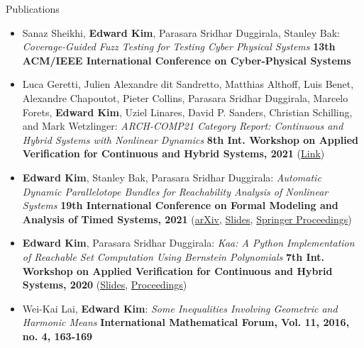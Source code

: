 \documentclass{resume} %
\begin{document}
\begin{rSection}{Publications}
  \begin{itemize}[leftmargin=*]
    \item Sanaz Sheikhi, {\bf Edward Kim}, Parasara Sridhar Duggirala, Stanley Bak: \newline
    \textit{Coverage-Guided Fuzz Testing for Testing Cyber Physical Systems} \newline
    {\bf 13th ACM/IEEE International Conference on Cyber-Physical Systems}

    \item  Luca Geretti, Julien Alexandre dit Sandretto, Matthias Althoff, Luis Benet, Alexandre Chapoutot, Pieter Collins, Parasara Sridhar Duggirala, Marcelo Forets, {\bf Edward Kim}, Uziel Linares, David P. Sanders, Christian Schilling, and Mark Wetzlinger: \newline
    \textit{ARCH-COMP21 Category Report: Continuous and Hybrid Systems with Nonlinear Dynamics} \newline
    {\bf 8th Int. Workshop on Applied Verification for Continuous and Hybrid Systems, 2021}
    \newline
    (\href{https://easychair.org/publications/paper/GWwz}{Link})

    \item {\bf Edward Kim}, Stanley Bak, Parasara Sridhar Duggirala: \newline
    \textit{Automatic Dynamic Parallelotope Bundles for Reachability Analysis of Nonlinear Systems} \newline
    {\bf 19th International Conference on Formal Modeling and Analysis of Timed Systems, 2021} \newline
    (\href{https://arxiv.org/abs/2105.11796}{arXiv}, \href{https://ekim1919.github.io/files/formats21.pdf)}{Slides}, \href{https://link.springer.com/book/10.1007/978-3-030-85037-1}{Springer Proceedings})

    \item {\bf Edward Kim}, Parasara Sridhar Duggirala: \newline
    \textit{Kaa: A Python Implementation of Reachable Set Computation Using Bernstein Polynomials} \newline
    {\bf 7th Int. Workshop on Applied Verification for Continuous and Hybrid Systems, 2020} \newline
    (\href{https://ekim1919.github.io/files/ARCH2020.pdf}{Slides}, \href{https://easychair.org/publications/volume/ARCH20}{Proceedings})

    \item Wei-Kai Lai, {\bf Edward Kim}: \newline
    \textit{Some Inequalities Involving Geometric and Harmonic Means} \newline
    {\bf International Mathematical Forum, Vol. 11, 2016, no. 4, 163-169}
  \end{itemize}
\end{rSection}
\end{document}
